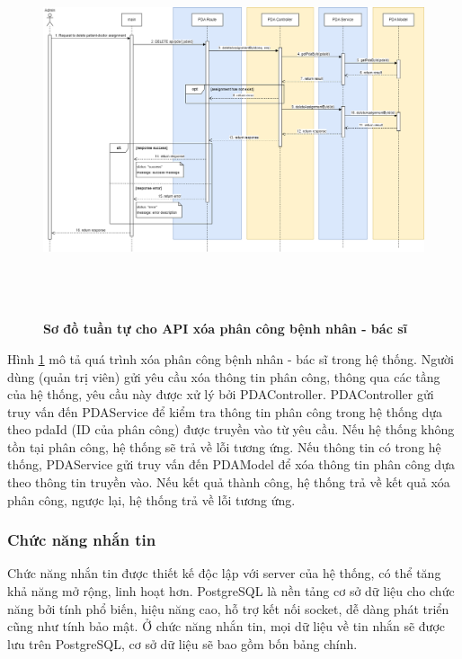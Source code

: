\begin{figure}[H]
  \centering
  \includegraphics[width=16cm,height=11cm]{Images/sequence_api/deleteAssignment.png}
  \caption[Sơ đồ tuần tự cho API xóa phân công bệnh nhân - bác sĩ]{\bfseries \fontsize{12pt}{0pt}
  \selectfont Sơ đồ tuần tự cho API xóa phân công bệnh nhân - bác sĩ }
  \label{api_deletePDA} %
\end{figure}
Hình \ref{api_deletePDA} mô tả quá trình xóa phân công bệnh nhân - bác sĩ trong hệ thống. Người dùng (quản trị viên) gửi yêu cầu xóa thông tin phân công, thông qua các tầng của hệ thống, 
yêu cầu này được xử lý bởi PDAController. PDAController gửi truy vấn đến PDAService để kiểm tra thông tin phân công trong hệ thống dựa theo pdaId (ID của phân công) được truyền vào từ yêu cầu. 
Nếu hệ thống không tồn tại phân công, hệ thống sẽ trả về lỗi tương ứng. Nếu thông tin có trong hệ thống, PDAService gửi truy vấn đến PDAModel để xóa thông tin phân công 
dựa theo thông tin truyền vào. Nếu kết quả thành công, hệ thống trả về kết quả xóa phân công, ngược lại, hệ thống trả về lỗi tương ứng.
\subsubsection{Chức năng nhắn tin}
Chức năng nhắn tin được thiết kế độc lập với server của hệ thống, có thể tăng khả năng mở rộng, linh hoạt hơn. 
PostgreSQL là nền tảng cơ sở dữ liệu cho chức năng bởi tính phổ biến, hiệu năng cao, hỗ trợ kết nối socket, dễ dàng phát triển cũng như tính bảo mật. Ở chức năng nhắn tin, mọi dữ liệu về tin nhắn sẽ được lưu trên
PostgreSQL, cơ sở dữ liệu sẽ bao gồm bốn bảng chính.

